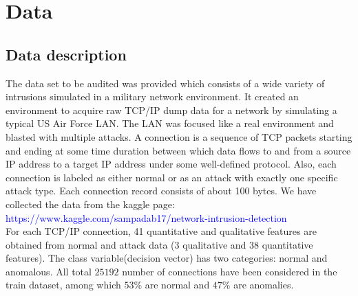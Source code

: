 \documentclass{llncs}
\begin{document}
\section{Data}
\subsection{Data description}
The data set to be audited was provided which consists of a wide variety of intrusions simulated in a military network environment. It created an environment to acquire raw TCP/IP dump data for a network by simulating a typical US Air Force LAN. The LAN was focused like a real environment and blasted with multiple attacks. A connection is a sequence of TCP packets starting and ending at some time duration between which data flows to and from a source IP address to a target IP address under some well-defined protocol. Also, each connection is labeled as either normal or as an attack with exactly one specific attack type. Each connection record consists of about 100 bytes. We have collected the data from the kaggle page:\\
\textcolor{blue}{  https://www.kaggle.com/sampadab17/network-intrusion-detection}  \\
For each TCP/IP connection, 41 quantitative and qualitative features are obtained from normal and attack data (3 qualitative and 38 quantitative features). The class variable(decision vector) has two categories: normal and anomalous. All total $25192$ number of connections have been considered in the train dataset, among which $ 53 \%$ are normal and $47 \%$ are anomalies.
\end{document}

